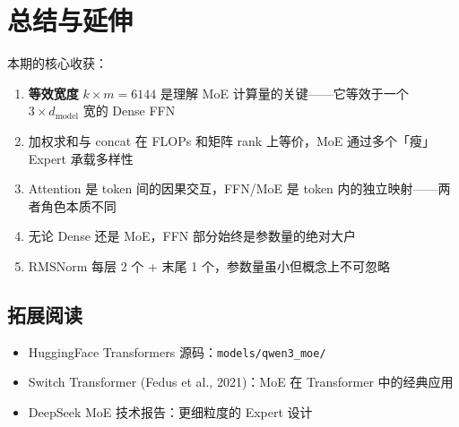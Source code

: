 \section{总结与延伸}

本期的核心收获：

\begin{enumerate}
  \item \textbf{等效宽度} $k \times m = 6144$ 是理解 MoE 计算量的关键——它等效于一个 $3 \times d_{\text{model}}$ 宽的 Dense FFN
  \item 加权求和与 concat 在 FLOPs 和矩阵 rank 上等价，MoE 通过多个「瘦」Expert 承载多样性
  \item Attention 是 token 间的因果交互，FFN/MoE 是 token 内的独立映射——两者角色本质不同
  \item 无论 Dense 还是 MoE，FFN 部分始终是参数量的绝对大户
  \item RMSNorm 每层 2 个 + 末尾 1 个，参数量虽小但概念上不可忽略
\end{enumerate}

\subsection{拓展阅读}

\begin{itemize}
  \item HuggingFace Transformers 源码：\texttt{models/qwen3\_moe/}
  \item Switch Transformer (Fedus et al., 2021)：MoE 在 Transformer 中的经典应用
  \item DeepSeek MoE 技术报告：更细粒度的 Expert 设计
\end{itemize}


